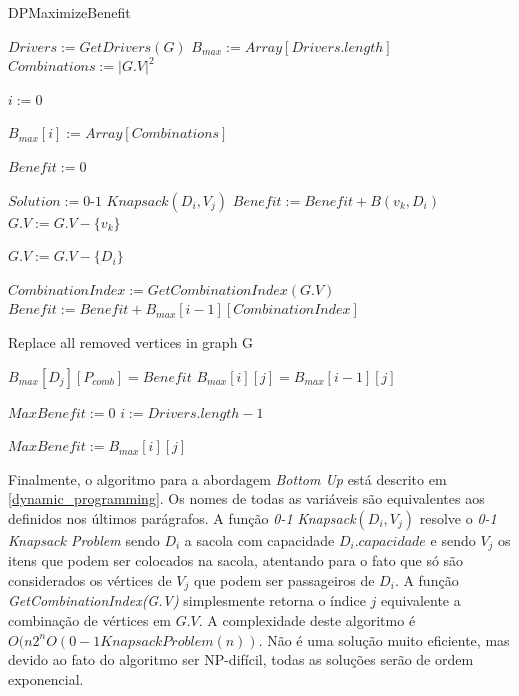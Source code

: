 \documentclass{article}
\begin{document}
\begin{algorithm}
\caption{DPMaximizeBenefit}
\begin{algorithmic}[1]

\State $ Drivers := GetDrivers(G) $
\State $ B_{max} := Array[Drivers.length] $
\State $ Combinations := |G.V|^2 $

\State $ i := 0 $
\item {}
  \State $ B_{max}[i] := Array[Combinations] $
\EndFor

\item {}
      \State $ Benefit := 0 $

      \State $ Solution := \textit{0-1 Knapsack}(D_i, V_j) $
        \State $ Benefit := Benefit + B(v_k, D_i) $
        \State $ G.V := G.V - \{ v_k \} $
      \EndFor
      
        \State $ G.V := G.V - \{ D_i \} $
      \EndIf

      \State $ CombinationIndex := GetCombinationIndex(G.V) $
      \State $ Benefit := Benefit + B_{max}[i - 1][CombinationIndex] $

      \State Replace all removed vertices in graph G
      
      \State $ B_{max}[D_j][P_{comb}] = Benefit $  
    \Else
      \State $ B_{max}[i][j] = B_{max}[i-1][j] $  
    \EndIf
  \EndFor
\EndFor

\State $ MaxBenefit := 0 $
\State $ i := Drivers.length - 1 $
\item {}
    \State $ MaxBenefit := B_{max}[i][j] $
  \EndIf
\EndFor

\EndProcedure
\end{algorithmic}
\label{alg:dynamic_programming}
\end{algorithm}

Finalmente, o algoritmo para a abordagem \textit{Bottom Up} está descrito em \ref{dynamic_programming}. Os
nomes de todas as variáveis são equivalentes aos definidos nos últimos parágrafos. A função \textit{0-1 Knapsack$(D_i, V_j)$}
resolve o \textit{0-1 Knapsack Problem} sendo $ D_i $ a sacola com capacidade $ D_i.capacidade $ e sendo $ V_j $ os
itens que podem ser colocados na sacola, atentando para o fato que só são considerados os vértices de $ V_j $ que podem
ser passageiros de $ D_i $. A função \textit{GetCombinationIndex(G.V)} simplesmente retorna o índice $ j $ equivalente
a combinação de vértices em $ G.V $. A complexidade deste algoritmo é $ O(n2^nO(0-1 Knapsack Problem(n)) $. Não é uma
solução muito eficiente, mas devido ao fato do algoritmo ser NP-difícil, todas as soluções serão de ordem exponencial.
\end{document}
